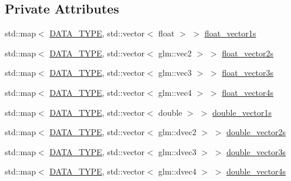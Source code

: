 \subsection*{Private Attributes}
\begin{DoxyCompactItemize}
\item 
std\+::map$<$ \hyperlink{class_graphics_1_1_vertex_data_a50e88236939dc2a3ec4df7aeb728620e}{D\+A\+T\+A\+\_\+\+T\+Y\+P\+E}, std\+::vector$<$ float $>$ $>$ \hyperlink{class_graphics_1_1_vertex_data_a8dd7ba1a6fd4ba256b8805a2efa5f086}{float\+\_\+vector1s}
\item 
std\+::map$<$ \hyperlink{class_graphics_1_1_vertex_data_a50e88236939dc2a3ec4df7aeb728620e}{D\+A\+T\+A\+\_\+\+T\+Y\+P\+E}, std\+::vector$<$ glm\+::vec2 $>$ $>$ \hyperlink{class_graphics_1_1_vertex_data_add262a2473187fe32842cfc13e4eb72f}{float\+\_\+vector2s}
\item 
std\+::map$<$ \hyperlink{class_graphics_1_1_vertex_data_a50e88236939dc2a3ec4df7aeb728620e}{D\+A\+T\+A\+\_\+\+T\+Y\+P\+E}, std\+::vector$<$ glm\+::vec3 $>$ $>$ \hyperlink{class_graphics_1_1_vertex_data_a5d84c110b57a1c72bf871da376f8ef16}{float\+\_\+vector3s}
\item 
std\+::map$<$ \hyperlink{class_graphics_1_1_vertex_data_a50e88236939dc2a3ec4df7aeb728620e}{D\+A\+T\+A\+\_\+\+T\+Y\+P\+E}, std\+::vector$<$ glm\+::vec4 $>$ $>$ \hyperlink{class_graphics_1_1_vertex_data_a51c220f8d25f8f6f02a4024842579a7f}{float\+\_\+vector4s}
\item 
std\+::map$<$ \hyperlink{class_graphics_1_1_vertex_data_a50e88236939dc2a3ec4df7aeb728620e}{D\+A\+T\+A\+\_\+\+T\+Y\+P\+E}, std\+::vector$<$ double $>$ $>$ \hyperlink{class_graphics_1_1_vertex_data_ae9a48ea752fa50a024958139cc588c66}{double\+\_\+vector1s}
\item 
std\+::map$<$ \hyperlink{class_graphics_1_1_vertex_data_a50e88236939dc2a3ec4df7aeb728620e}{D\+A\+T\+A\+\_\+\+T\+Y\+P\+E}, std\+::vector$<$ glm\+::dvec2 $>$ $>$ \hyperlink{class_graphics_1_1_vertex_data_a0d9340ce408b8d5066524f440bc41067}{double\+\_\+vector2s}
\item 
std\+::map$<$ \hyperlink{class_graphics_1_1_vertex_data_a50e88236939dc2a3ec4df7aeb728620e}{D\+A\+T\+A\+\_\+\+T\+Y\+P\+E}, std\+::vector$<$ glm\+::dvec3 $>$ $>$ \hyperlink{class_graphics_1_1_vertex_data_acd623a5856ffac27e3cd51b4202def6d}{double\+\_\+vector3s}
\item 
std\+::map$<$ \hyperlink{class_graphics_1_1_vertex_data_a50e88236939dc2a3ec4df7aeb728620e}{D\+A\+T\+A\+\_\+\+T\+Y\+P\+E}, std\+::vector$<$ glm\+::dvec4 $>$ $>$ \hyperlink{class_graphics_1_1_vertex_data_a1b65aafda38402e62d0b52d7822492d9}{double\+\_\+vector4s}

\end{DoxyCompactItemize}
